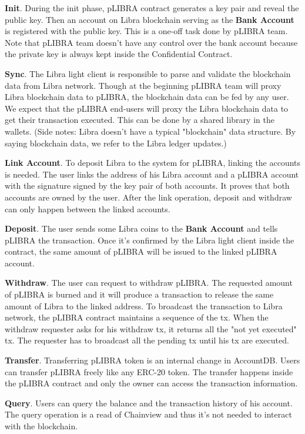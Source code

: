 \begin{icompact}
    \item \textbf{Init}. During the init phase, pLIBRA contract generates a key pair and reveal the public key. Then an account on Libra blockchain serving as the \textbf{Bank Account} is registered with the public key. This is a one-off task done by pLIBRA team. Note that pLIBRA team doesn't have any control over the bank account because the private key is always kept inside the Confidential Contract.
    \item \textbf{Sync}. The Libra light client is responsible to parse and validate the blockchain data from Libra network. Though at the beginning pLIBRA team will proxy Libra blockchain data to pLIBRA, the blockchain data can be fed by any user. We expect that the pLIBRA end-users will proxy the Libra blockchain data to get their transaction executed. This can be done by a shared library in the wallets. (Side notes: Libra doesn't have a typical "blockchain" data structure. By saying blockchain data, we refer to the Libra ledger updates.)
    \item \textbf{Link Account}. To deposit Libra to the system for pLIBRA, linking the accounts is needed. The user links the address of his Libra account and a pLIBRA account with the signature signed by the key pair of both accounts. It proves that both accounts are owned by the user. After the link operation, deposit and withdraw can only happen between the linked accounts.
    \item \textbf{Deposit}. The user sends some Libra coins to the \textbf{Bank Account} and tells pLIBRA the transaction. Once it's confirmed by the Libra light client inside the contract, the same amount of pLIBRA will be issued to the linked pLIBRA account.
    \item \textbf{Withdraw}. The user can request to withdraw pLIBRA. The requested amount of pLIBRA is burned and it will produce a transaction to release the same amount of Libra to the linked address. To broadcast the transaction to Libra network, the pLIBRA contract maintains a sequence of the tx. When the withdraw requester asks for his withdraw tx, it returns all the "not yet executed" tx. The requester has to broadcast all the pending tx until his tx are executed.
    \item \textbf{Transfer}. Transferring pLIBRA token is an internal change in AccountDB. Users can transfer pLIBRA freely like any ERC-20 token. The transfer happens inside the pLIBRA contract and only the owner can access the transaction information.
    \item \textbf{Query}. Users can query the balance and the transaction history of his account. The query operation is a read of Chainview and thus it's not needed to interact with the blockchain.
\end{icompact}